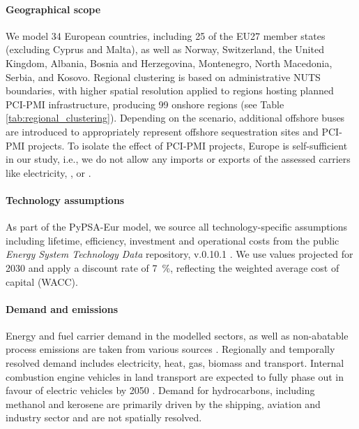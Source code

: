 \documentclass[preprint,12pt,sort&compress]{elsarticle}
\begin{document}
\paragraph{Geographical scope} 
\label{sec:geographical_scope}
We model 34 European countries, including 25 of the EU27 member states (excluding Cyprus and Malta), as well as Norway, Switzerland, the United Kingdom, Albania, Bosnia and Herzegovina, Montenegro, North Macedonia, Serbia, and Kosovo. Regional clustering is based on administrative NUTS boundaries, with higher spatial resolution applied to regions hosting planned PCI-PMI infrastructure, producing 99 onshore regions (see Table \ref{tab:regional_clustering}). Depending on the scenario, additional offshore buses are introduced to appropriately represent offshore sequestration sites and PCI-PMI projects. To isolate the effect of PCI-PMI projects, Europe is self-sufficient in our study, i.e., we do not allow any imports or exports of the assessed carriers like electricity, , or . 

\paragraph{Technology assumptions} 
\label{sec:technology_assumptions}
As part of the PyPSA-Eur model, we source all technology-specific assumptions including lifetime, efficiency, investment and operational costs from the public \textit{Energy System Technology Data} repository, v.0.10.1 \cite{zeyenPyPSATechnologydataV01012025}. We use values projected for 2030 and apply a discount rate of \SI{7}{\percent}, reflecting the weighted average cost of capital (WACC).

\paragraph{Demand and  emissions}
\label{sec:demand_and_co2_emissions}
Energy and fuel carrier demand in the modelled sectors, as well as non-abatable  process emissions are taken from various sources \cite{mantzosJRCIDEES20152018,eurostatCompleteEnergyBalances2022,manzGeoreferencedIndustrialSites2018,muehlenpfordtTimeSeries2019,krienOemofDemandlibV0222025}. Regionally and temporally resolved demand includes electricity, heat, gas, biomass and transport. Internal combustion engine vehicles in land transport are expected to fully phase out in favour of electric vehicles by 2050 \cite{zeyenShiftingBurdensHow2025a}. Demand for hydrocarbons, including methanol and kerosene are primarily driven by the shipping, aviation and industry sector and are not spatially resolved.
\end{document}
